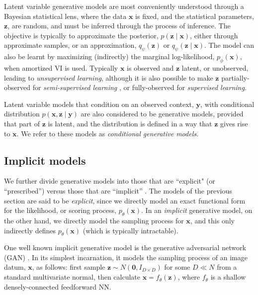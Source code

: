 Latent variable generative models are most conveniently understood through a Bayesian statistical lens, where the data $\mathbf{x}$ is fixed, and the statistical parameters, $\mathbf{z}$, are random, and must be inferred through the process of inference. The objective is typically to approximate the posterior, $p(\mathbf{z}\mid\mathbf{x})$, either through approximate samples, or an approximation, $q_\psi(\mathbf{z})$ or $q_\psi(\mathbf{z}\mid\mathbf{x})$. The model can also be learnt by maximizing (indirectly) the marginal log-likelihood, $p_\phi(\mathbf{x})$, when amortized VI is used. Typically $\mathbf{x}$ is observed and $\mathbf{z}$ latent, or unobserved, leading to \emph{unsupervised learning}, although it is also possible to make $\mathbf{z}$ partially-observed for \emph{semi-supervised learning} \citep{KingmaEtAl2014, SiddharthEtAl2017}, or fully-observed for \emph{supervised learning}.

Latent variable models that condition on an observed context, $\mathbf{y}$, with conditional distribution $p(\mathbf{x},\mathbf{z}\mid\mathbf{y})$ are also considered to be generative models, provided that part of $\mathbf{z}$ is latent, and the distribution is defined in a way that $\mathbf{z}$ gives rise to $\mathbf{x}$. We refer to these models as \emph{conditional generative models}.

\subsection{Implicit models}\label{sec:gans}
We further divide generative models into those that are ``explicit" (or ``prescribed'') versus those that are ``implicit'' \citep{mohamed2016learning}. The models of the previous section are said to be \emph{explicit}, since we directly model an exact functional form for the likelihood, or scoring process, $p_\theta(\mathbf{x})$. In an \emph{implicit} generative model, on the other hand, we directly model the sampling process for $\mathbf{x}$, and this only indirectly defines $p_\theta(\mathbf{x})$ (which is typically intractable).

One well known implicit generative model is the generative adversarial network (GAN) \citep{GoodfellowEtAl2014}. In its simplest incarnation, it models the sampling process of an image datum, $\mathbf{x}$, as follows: first sample $\mathbf{z}\sim N(\mathbf{0},I_{D\times D})$ for some $D\ll N$ from a standard multivariate normal, then calculate $\mathbf{x}=f_\theta(\mathbf{z})$, where $f_\theta$ is a shallow densely-connected feedforward NN.

